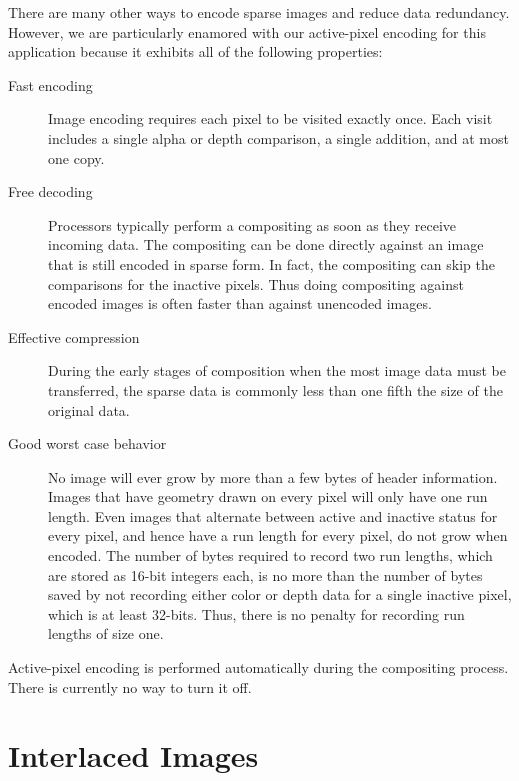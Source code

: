 There are many other ways to encode sparse images and reduce data
redundancy.  However, we are particularly enamored with our active-pixel
encoding for this application because it exhibits all of the following
properties:

\begin{description}
\item[Fast encoding]  Image encoding requires each pixel to be visited
  exactly once.  Each visit includes a single alpha or depth comparison, a
  single addition, and at most one copy.
\item[Free decoding]  Processors typically perform a compositing as
  soon as they receive incoming data.  The compositing can be done
  directly against an image that is still encoded in sparse form.  In fact,
  the compositing can skip the comparisons for the inactive pixels.
  Thus doing compositing against encoded images is often faster than
  against unencoded images.
\item[Effective compression]  During the early stages of composition when
  the most image data must be transferred, the sparse data is commonly less
  than one fifth the size of the original data.
\item[Good worst case behavior] No image will ever grow by more than a few
  bytes of header information.  Images that have geometry drawn on every
  pixel will only have one run length.  Even images that alternate between
  active and inactive status for every pixel, and hence have a run length
  for every pixel, do not grow when encoded.  The number of bytes required
  to record two run lengths, which are stored as 16-bit integers each, is
  no more than the number of bytes saved by not recording either color or
  depth data for a single inactive pixel, which is at least 32-bits.  Thus,
  there is no penalty for recording run lengths of size one.
\end{description}

Active-pixel encoding is performed automatically during the compositing
process.  There is currently no way to turn it off.


\section{Interlaced Images}
\label{sec:Customizing_Compositing:Interlaced_Images}


